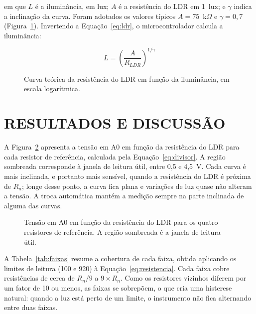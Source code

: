 \documentclass[11pt,a4paper]{article}
\begin{document}
\noindent em que $L$ é a iluminância, em lux; $A$ é a resistência do LDR em 1~lux; e $\gamma$ indica a inclinação da curva. Foram adotados os valores típicos $A = 75$~k$\Omega$ e $\gamma = 0{,}7$ (Figura~\ref{fig:ldr}). Invertendo a Equação~\ref{eq:ldr}, o microcontrolador calcula a iluminância:

\begin{equation}
	L = \left( \frac{A}{R_{LDR}} \right)^{1/\gamma}
	\label{eq:lux}
\end{equation}

\begin{figure}[htbp]
	\centering
	
	\caption{Curva teórica da resistência do LDR em função da iluminância, em escala logarítmica.}
	\label{fig:ldr}
\end{figure}

\section*{RESULTADOS E DISCUSSÃO}

A Figura~\ref{fig:divisor} apresenta a tensão em A0 em função da resistência do LDR para cada resistor de referência, calculada pela Equação~\ref{eq:divisor}. A região sombreada corresponde à janela de leitura útil, entre 0,5 e 4,5~V. Cada curva é mais inclinada, e portanto mais sensível, quando a resistência do LDR é próxima de $R_n$; longe desse ponto, a curva fica plana e variações de luz quase não alteram a tensão. A troca automática mantém a medição sempre na parte inclinada de alguma das curvas.

\begin{figure}[htbp]
	\centering
	
	\caption{Tensão em A0 em função da resistência do LDR para os quatro resistores de referência. A região sombreada é a janela de leitura útil.}
	\label{fig:divisor}
\end{figure}

A Tabela~\ref{tab:faixas} resume a cobertura de cada faixa, obtida aplicando os limites de leitura (100 e 920) à Equação~\ref{eq:resistencia}. Cada faixa cobre resistências de cerca de $R_n/9$ a $9 \times R_n$. Como os resistores vizinhos diferem por um fator de 10 ou menos, as faixas se sobrepõem, o que cria uma histerese natural: quando a luz está perto de um limite, o instrumento não fica alternando entre duas faixas.
\end{document}
